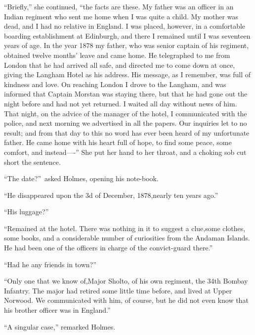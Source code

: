 \documentclass[12pt,english,oneside]{book}
\begin{document}
{}``Briefly,'' she continued, {}``the facts are these. My father
was an officer in an Indian regiment who sent me home when I was quite
a child. My mother was dead, and I had no relative in England. I was
placed, however, in a comfortable boarding establishment at Edinburgh,
and there I remained until I was seventeen years of age. In the year
1878 my father, who was senior captain of his regiment, obtained twelve
months' leave and came home. He telegraphed to me from London that
he had arrived all safe, and directed me to come down at once, giving
the Langham Hotel as his address. His message, as I remember, was
full of kindness and love. On reaching London I drove to the Langham,
and was informed that Captain Morstan was staying there, but that
he had gone out the night before and had not yet returned. I waited
all day without news of him. That night, on the advice of the manager
of the hotel, I communicated with the police, and next morning we
advertised in all the papers. Our inquiries let to no result; and
from that day to this no word has ever been heard of my unfortunate
father. He came home with his heart full of hope, to find some peace,
some comfort, and instead\mbox{----}'' She put her hand to her throat,
and a choking sob cut short the sentence.

{}``The date?''\ asked Holmes, opening his note-book.

{}``He disappeared upon the 3d of December, 1878,\mdsh{---}nearly
ten years ago.''

{}``His luggage?''

{}``Remained at the hotel. There was nothing in it to suggest a clue,\mdsh{---}some
clothes, some books, and a considerable number of curiosities from
the Andaman Islands. He had been one of the officers in charge of
the convict-guard there.''

{}``Had he any friends in town?''

{}``Only one that we know of,\mdsh{---}Major Sholto, of his own
regiment, the 34th Bombay Infantry. The major had retired some little
time before, and lived at Upper Norwood. We communicated with him,
of course, but he did not even know that his brother officer was in
England.''

{}``A singular case,'' remarked Holmes.
\end{document}
